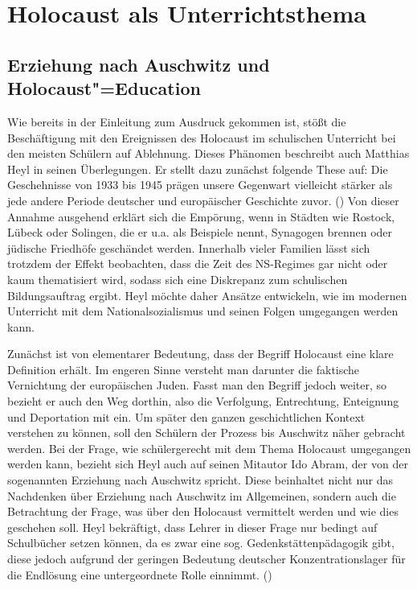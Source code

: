 \section{Holocaust als Unterrichtsthema}
\subsection{Erziehung nach Auschwitz und \glqq Holocaust"=Education\grqq{}}
Wie bereits in der Einleitung zum Ausdruck gekommen ist, stößt die Beschäftigung mit den Ereignissen des Holocaust im schulischen Unterricht bei den meisten Schülern auf Ablehnung.
Dieses Phänomen beschreibt auch Matthias Heyl in seinen Überlegungen.
Er stellt dazu zunächst folgende These auf: \glqq Die Geschehnisse von 1933 bis 1945 prägen unsere Gegenwart vielleicht stärker als jede andere Periode deutscher und europäischer Geschichte zuvor.\grqq{} (\cite[S.\,61]{IA96}) Von dieser Annahme ausgehend erklärt sich die Empörung, wenn in Städten wie Rostock, Lübeck oder Solingen, die er u.a.
als Beispiele nennt, Synagogen brennen oder jüdische Friedhöfe geschändet werden.
Innerhalb vieler Familien lässt sich trotzdem der Effekt beobachten, dass die Zeit des NS-Regimes gar nicht oder kaum thematisiert wird, sodass sich eine Diskrepanz zum schulischen Bildungsauftrag ergibt.
Heyl möchte daher Ansätze entwickeln, wie im modernen Unterricht mit dem Nationalsozialismus und seinen Folgen umgegangen werden kann.

Zunächst ist von elementarer Bedeutung, dass der Begriff \glqq Holocaust\grqq{} eine klare Definition erhält.
Im engeren Sinne versteht man darunter die faktische Vernichtung der europäischen Juden.
Fasst man den Begriff jedoch weiter, so bezieht er auch den Weg dorthin, also die Verfolgung, Entrechtung, Enteignung und Deportation mit ein.
Um später den ganzen geschichtlichen Kontext verstehen zu können, soll den Schülern der Prozess bis \glqq Auschwitz\grqq{} näher gebracht werden.
Bei der Frage, wie schülergerecht mit dem Thema \glqq Holocaust\grqq{} umgegangen werden kann, bezieht sich Heyl auch auf seinen Mitautor Ido Abram, der von der sogenannten \glqq Erziehung nach Auschwitz\grqq{} spricht.
Diese beinhaltet nicht nur das Nachdenken über Erziehung nach Auschwitz im Allgemeinen, sondern auch die Betrachtung der Frage, was über den Holocaust vermittelt werden und wie dies geschehen soll.
Heyl bekräftigt, dass Lehrer in dieser Frage nur bedingt auf Schulbücher setzen können, da es zwar eine sog.
\glqq Gedenkstättenpädagogik\grqq{} gibt, diese jedoch aufgrund der geringen Bedeutung deutscher Konzentrationslager für die \glqq Endlösung\grqq{} eine untergeordnete Rolle einnimmt.
(\cite[S.\,64]{IA96})

